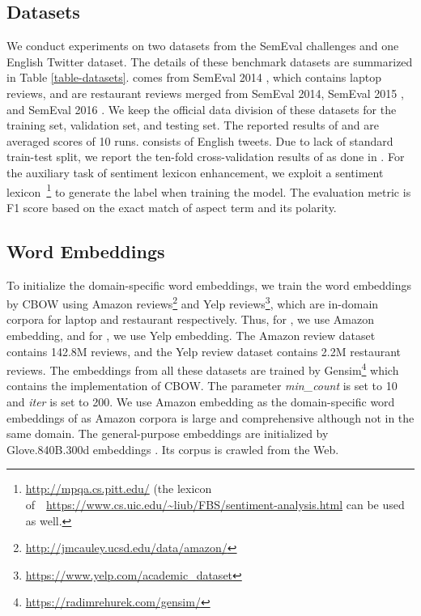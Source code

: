 \documentclass[11pt,a4paper]{article}
\begin{document}
	\subsection{Datasets}
	We conduct experiments on two datasets from the SemEval challenges and one English Twitter dataset. The details of these benchmark datasets are summarized in Table \ref{table-datasets}.  comes from SemEval 2014 \cite{Pontiki2014}, which contains laptop reviews, and  are restaurant reviews merged from SemEval 2014, SemEval 2015 \cite{Pontiki2015}, and SemEval 2016 \cite{Pontiki2016}. We keep the official data division of these datasets for the training set, validation set, and testing set. The reported results of  and  are averaged scores of 10 runs.  consists of English tweets. Due to lack of standard train-test split, we report the ten-fold cross-validation results of  as done in \cite{Mitchell2013,Zhang2015,Li2019}. For the auxiliary task of sentiment lexicon enhancement, we exploit a sentiment lexicon~\footnote{\url{http://mpqa.cs.pitt.edu/} (the lexicon of~\cite{Hu2004}~\url{https://www.cs.uic.edu/~liub/FBS/sentiment-analysis.html} can be used as well.} to generate the label when training the model. The evaluation metric is F1 score based on the exact match of aspect term and its polarity.
	
	\subsection{Word Embeddings}
	To initialize the domain-specific word embeddings, we train the word embeddings by CBOW \cite{Mikolov2013} using Amazon reviews\footnote{\url{http://jmcauley.ucsd.edu/data/amazon/}} and Yelp reviews\footnote{\url{https://www.yelp.com/academic_dataset}}, which are in-domain corpora for laptop and restaurant respectively. Thus, for , we use Amazon embedding, and for , we use Yelp embedding. The Amazon review dataset contains 142.8M reviews, and the Yelp review dataset contains 2.2M restaurant reviews. The embeddings from all these datasets are trained by Gensim\footnote{\url{https://radimrehurek.com/gensim/}} which contains the implementation of CBOW. The parameter \emph{min\_count} is set to 10 and \emph{iter} is set to 200. We use Amazon embedding as the domain-specific word embeddings of  as Amazon corpora is large and comprehensive although not in the same domain. The general-purpose embeddings are initialized by Glove.840B.300d embeddings \cite{Pennington2014}. Its corpus is crawled from the Web.
\end{document}
